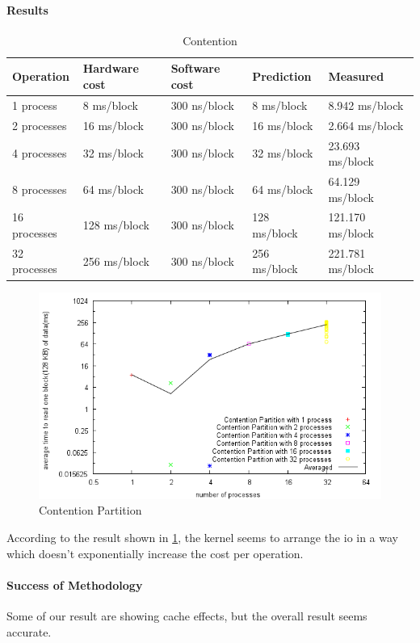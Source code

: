 \paragraph{Results}
\begin{table}
\begin{center}
\begin{tabular}{| l | l | l | l | l |}
\hline
Operation & Hardware cost & Software cost & Prediction & Measured \\
\hline
1 process	& 8 ms/block	& 300 ns/block       & 8 ms/block        & 8.942    ms/block \\ \hline
2 processes	& 16 ms/block	& 300 ns/block       & 16 ms/block       & 2.664    ms/block \\ \hline
4 processes	& 32 ms/block	& 300 ns/block       & 32 ms/block       & 23.693    ms/block \\ \hline
8 processes	& 64 ms/block	& 300 ns/block       & 64 ms/block       & 64.129    ms/block \\ \hline
16 processes	& 128 ms/block	& 300 ns/block       & 128 ms/block      & 121.170    ms/block \\ \hline
32 processes	& 256 ms/block	& 300 ns/block       & 256 ms/block      & 221.781    ms/block \\ \hline

\end{tabular}
\end{center}
\caption{Contention\label{tab:contention}}
\end{table}

\begin{figure}[h]
\begin{center}
\includegraphics[scale=0.8]{contentionPartitionImage}
\end{center}
\caption {Contention Partition\label{fig:contention-partition}}
\end{figure}

According to the result shown in \ref{tab:contention}, the kernel seems to
arrange the io in a way which doesn't exponentially increase the cost per
operation.

\paragraph{Success of Methodology}
Some of our result are showing cache effects, but the overall result seems
accurate.
